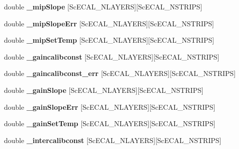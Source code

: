 \begin{DoxyCompactItemize}
\item 
double {\bfseries \-\_\-mip\-Slope} [Sc\-E\-C\-A\-L\-\_\-\-N\-L\-A\-Y\-E\-R\-S][Sc\-E\-C\-A\-L\-\_\-\-N\-S\-T\-R\-I\-P\-S]\label{classCALICE_1_1IntegratedScECALCalibrationProcessor_a51de70a9fb886693481b7c7e3173fed1}

\item 
double {\bfseries \-\_\-mip\-Slope\-Err} [Sc\-E\-C\-A\-L\-\_\-\-N\-L\-A\-Y\-E\-R\-S][Sc\-E\-C\-A\-L\-\_\-\-N\-S\-T\-R\-I\-P\-S]\label{classCALICE_1_1IntegratedScECALCalibrationProcessor_a883ef441c0a3098f7319e1e8d48aada2}

\item 
double {\bfseries \-\_\-mip\-Set\-Temp} [Sc\-E\-C\-A\-L\-\_\-\-N\-L\-A\-Y\-E\-R\-S][Sc\-E\-C\-A\-L\-\_\-\-N\-S\-T\-R\-I\-P\-S]\label{classCALICE_1_1IntegratedScECALCalibrationProcessor_a256c3d9ae521ccef87b79c161616be65}

\item 
double {\bfseries \-\_\-gaincalibconst} [Sc\-E\-C\-A\-L\-\_\-\-N\-L\-A\-Y\-E\-R\-S][Sc\-E\-C\-A\-L\-\_\-\-N\-S\-T\-R\-I\-P\-S]\label{classCALICE_1_1IntegratedScECALCalibrationProcessor_ac01bc7902f8f262fa3590f0facb31ebc}

\item 
double {\bfseries \-\_\-gaincalibconst\-\_\-err} [Sc\-E\-C\-A\-L\-\_\-\-N\-L\-A\-Y\-E\-R\-S][Sc\-E\-C\-A\-L\-\_\-\-N\-S\-T\-R\-I\-P\-S]\label{classCALICE_1_1IntegratedScECALCalibrationProcessor_ad6651fc69410049bdde46bfda31192e3}

\item 
double {\bfseries \-\_\-gain\-Slope} [Sc\-E\-C\-A\-L\-\_\-\-N\-L\-A\-Y\-E\-R\-S][Sc\-E\-C\-A\-L\-\_\-\-N\-S\-T\-R\-I\-P\-S]\label{classCALICE_1_1IntegratedScECALCalibrationProcessor_a0c09c5acb333c533ac0dc9d5081c6076}

\item 
double {\bfseries \-\_\-gain\-Slope\-Err} [Sc\-E\-C\-A\-L\-\_\-\-N\-L\-A\-Y\-E\-R\-S][Sc\-E\-C\-A\-L\-\_\-\-N\-S\-T\-R\-I\-P\-S]\label{classCALICE_1_1IntegratedScECALCalibrationProcessor_ad9122fb35196a1e8c128bc810dd73f48}

\item 
double {\bfseries \-\_\-gain\-Set\-Temp} [Sc\-E\-C\-A\-L\-\_\-\-N\-L\-A\-Y\-E\-R\-S][Sc\-E\-C\-A\-L\-\_\-\-N\-S\-T\-R\-I\-P\-S]\label{classCALICE_1_1IntegratedScECALCalibrationProcessor_a0d302f9a7fe000202b8e2b3315e37a42}

\item 
double {\bfseries \-\_\-intercalibconst} [Sc\-E\-C\-A\-L\-\_\-\-N\-L\-A\-Y\-E\-R\-S][Sc\-E\-C\-A\-L\-\_\-\-N\-S\-T\-R\-I\-P\-S]\label{classCALICE_1_1IntegratedScECALCalibrationProcessor_a19843391c2f2d492ee8d07cf560d61b3}


\end{DoxyCompactItemize}
